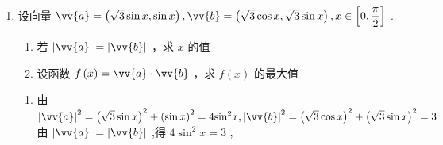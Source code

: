 \begin{enumerate}
\begin{enumerate}
\begin{jieda}
\begin{enumerate}
                令 $\dfrac{\pi }{2} + {2k\pi } \leq  {2x} - \dfrac{\pi }{6} \leq  \dfrac{3\pi }{2} + {2k\pi }\left( {k \in  {Z}}\right)$ ,解得 $\dfrac{\pi }{3} + {k\pi } \leq  x \leq  \dfrac{5\pi }{6} + {k\pi }$ ,
                
                解得 $f\left( x\right)$ 的单调减区间为 $\left\lbrack  {\dfrac{\pi }{3} + {k\pi },\dfrac{5\pi }{6} + {k\pi }}\right\rbrack  ,k \in  {Z}$ .
                \item 由(1)可知,当 $k =  - 1$ 时, $f\left( x\right)$ 的单调减区间为 $\left( {-\dfrac{2\pi }{3}, - \dfrac{\pi }{6}}\right)$ ,
                
                则在 $x \in  \left\lbrack  {-\dfrac{\pi }{3},\dfrac{\pi }{3}}\right\rbrack$ 上, $f\left( x\right)$ 在 $\left\lbrack  {-\dfrac{\pi }{3}, - \dfrac{\pi }{6}}\right)$ 上单调递减,在 $\left( {-\dfrac{\pi }{6},\dfrac{\pi }{3}}\right\rbrack$ 上单调递增,
                
                所以 $f{\left( x\right) }_{\min } = f\left( {-\dfrac{\pi }{6}}\right)  = \dfrac{1}{2} + \sin \left( {-2 \times  \dfrac{\pi }{6} - \dfrac{\pi }{6}}\right)  = \dfrac{1}{2} - 1 =  - \dfrac{1}{2}$ ,
                
                即 $f\left( x\right)$ 在 $x =  - \dfrac{\pi }{6}$ 处取得最小值 $- \dfrac{1}{2}$ .
            \end{enumerate}
        \end{jieda}
        \item 设向量 $\vv{a} = \left( {\sqrt{3}\sin x,\sin x}\right) ,\vv{b} = \left( {\sqrt{3}\cos x,\sqrt{3}\sin x}\right) ,x \in  \left\lbrack  {0,\dfrac{\pi }{2}}\right\rbrack$ .
        \begin{enumerate}
            \item 若 $\left| \vv{a}\right|  = \left| \vv{b}\right|$ ，求 $x$ 的值
            \item 设函数 $f\left( x\right)  = \vv{a} \cdot  \vv{b}$ ，求 $f\left( x\right)$ 的最大值
        \end{enumerate}
        \begin{jieda}
            \begin{enumerate}
                \item 由 ${\left| \vv{a}\right| }^{2} = {\left( \sqrt{3}\sin x\right) }^{2} + {\left( \sin x\right) }^{2} = 4{\sin }^{2}x,{\left| \vv{b}\right| }^{2} = {\left( \sqrt{3}\cos x\right) }^{2} + {\left( \sqrt{3}\sin x\right) }^{2} = 3$ 由 $\left| \vv{a}\right|  = \left| \vv{b}\right|$ ,得 $4{\sin }^{2}x = 3$ ,
                

\end{enumerate}
\end{jieda}
\end{enumerate}
\end{enumerate}
